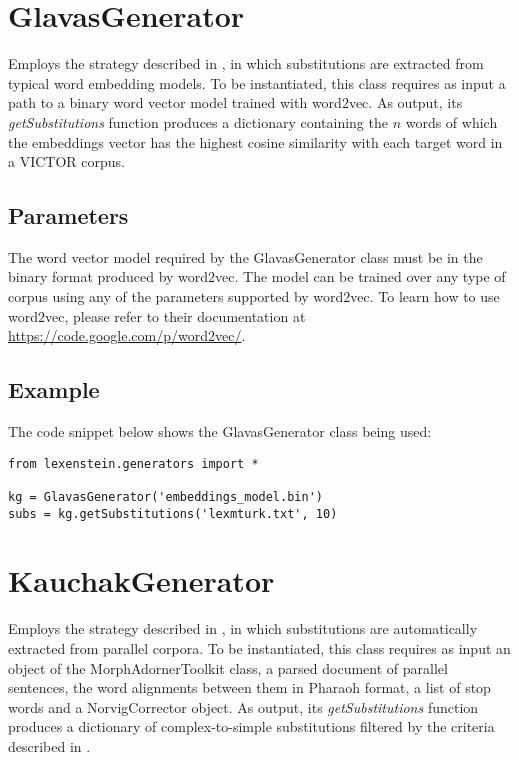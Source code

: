 \section{GlavasGenerator}

Employs the strategy described in \cite{glavas2015}, in which substitutions are extracted from typical word embedding models. To be instantiated, this class requires as input a path to a binary word vector model trained with word$2$vec. As output, its \textit{getSubstitutions} function produces a dictionary containing the $n$ words of which the embeddings vector has the highest cosine similarity with each target word in a VICTOR corpus.

\subsection{Parameters}

The word vector model required by the GlavasGenerator class must be in the binary format produced by word$2$vec. The model can be trained over any type of corpus using any of the parameters supported by word$2$vec. To learn how to use word$2$vec, please refer to their documentation at \url{https://code.google.com/p/word2vec/}.



\subsection{Example}

The code snippet below shows the GlavasGenerator class being used:

\begin{lstlisting}
from lexenstein.generators import *

kg = GlavasGenerator('embeddings_model.bin')
subs = kg.getSubstitutions('lexmturk.txt', 10)
\end{lstlisting}













\section{KauchakGenerator}

Employs the strategy described in \cite{Horn2014}, in which substitutions are automatically extracted from parallel corpora. To be instantiated, this class requires as input an object of the MorphAdornerToolkit class, a parsed document of parallel sentences, the word alignments between them in Pharaoh format, a list of stop words and a NorvigCorrector object. As output, its \textit{getSubstitutions} function produces a dictionary of complex-to-simple substitutions filtered by the criteria described in \cite{Horn2014}.

